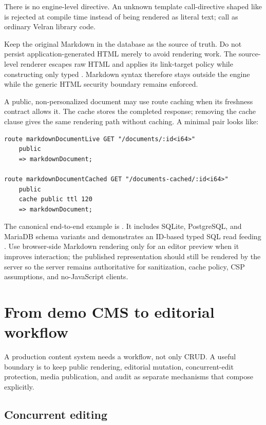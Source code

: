 There is no engine-level  directive. An unknown template call-directive shaped like  is rejected at compile time instead of being rendered as literal text; call  as ordinary Velran library code.

Keep the original Markdown in the database as the source of truth. Do not persist application-generated HTML merely to avoid rendering work. The source-level renderer escapes raw HTML and applies its link-target policy while constructing only typed . Markdown syntax therefore stays outside the engine while the generic HTML security boundary remains enforced.

A public, non-personalized document may use route caching when its freshness contract allows it. The cache stores the completed response; removing the cache clause gives the same rendering path without caching. A minimal pair looks like:

\begin{lstlisting}[language=Velran]
route markdownDocumentLive GET "/documents/:id<i64>"
    public
    => markdownDocument;

route markdownDocumentCached GET "/documents-cached/:id<i64>"
    public
    cache public ttl 120
    => markdownDocument;
\end{lstlisting}

The canonical end-to-end example is . It includes SQLite, PostgreSQL, and MariaDB schema variants and demonstrates an ID-based typed SQL read feeding . Use browser-side Markdown rendering only for an editor preview when it improves interaction; the published representation should still be rendered by the server so the server remains authoritative for sanitization, cache policy, CSP assumptions, and no-JavaScript clients.

\section{From demo CMS to editorial workflow}

A production content system needs a workflow, not only CRUD. A useful boundary is to keep public rendering, editorial mutation, concurrent-edit protection, media publication, and audit as separate mechanisms that compose explicitly.

\subsection*{Concurrent editing}

